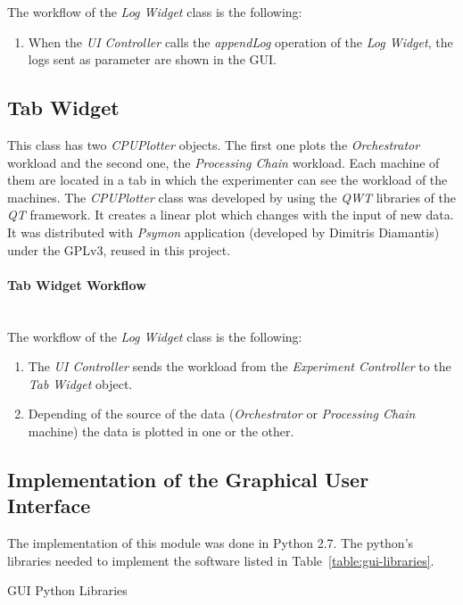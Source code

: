 The workflow of the \emph{Log Widget} class is the following:
\begin{enumerate}
\item When the \emph{UI Controller} calls the \emph{appendLog} operation of the \emph{Log Widget}, the logs sent as parameter are shown in the \ac{GUI}.
\end{enumerate}

\subsection{Tab Widget}

This class has two \emph{CPUPlotter} objects. The first one plots the \emph{Orchestrator} workload and the second one, the \emph{Processing Chain} workload. Each machine of them are located in a tab in which  the experimenter can see the workload of the machines.
The \emph{CPUPlotter} class was developed by using the \emph{QWT} libraries of the \emph{QT} framework. It creates a linear plot which changes with the input of new data. It was distributed with \emph{Psymon} application (developed by Dimitris Diamantis) under the \ac{GPL}v3, reused in this project.

\paragraph{Tab Widget  Workflow}~\\

The workflow of the \emph{Log Widget} class is the following:
\begin{enumerate}
\item The \emph{UI Controller} sends the workload from the \emph{Experiment Controller} to the \emph{Tab Widget} object. 
\item Depending of the source of the data (\emph{Orchestrator} or \emph{Processing Chain} machine) the data is plotted in one or the other.
\end{enumerate}


\subsection{Implementation of the Graphical User Interface}


The implementation of this module was done in Python 2.7. The python's libraries
needed to implement the software  listed in
Table~\ref{table:gui-libraries}.

\begin{table}[!h]
  \centering
  {\small
  
  }
  \caption{GUI Python Libraries}
  \label{table:gui-libraries}
\end{table}

